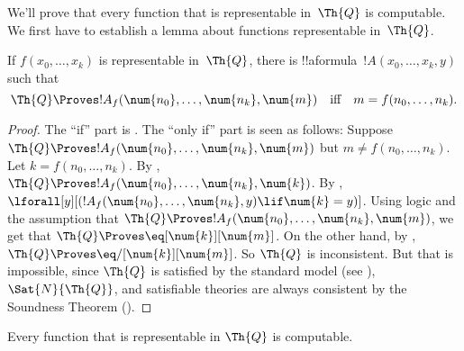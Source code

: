 \documentclass[../../../include/open-logic-section]{subfiles}
\begin{document}

We'll prove that every function that is representable in~$\Th{Q}$ is
computable. We first have to establish a lemma about functions
representable in~$\Th{Q}$.

\begin{lem}
  If $f(x_0,
  \dots, x_k)$ is representable in~$\Th{Q}$, there is
  !!a{formula}~$!A(x_0, \dots, x_k, y)$ such that
  \[
  \Th{Q} \Proves !A_f(\num{n_0}, \dots, \num{n_k}, \num{m})
  \quad\text{iff}\quad m = f(n_0, \dots, n_k).
  \]
\end{lem}

\begin{proof}
  The ``if'' part is
. The ``only
if'' part is seen as follows: Suppose $\Th{Q} \Proves !A_f(\num{n_0},
\dots, \num{n_k}, \num{m})$ but $m \neq f(n_0, \dots, n_k)$. Let $k =
f(n_0, \dots, n_k)$. By
, $\Th{Q}
\Proves !A_f(\num{n_0}, \dots, \num{n_k}, \num{k})$. By
,
$\lforall[y][(!A_f(\num{n_0}, \dots, \num{n_k}, y) \lif \num{k} =
y)]$. Using logic and the assumption that $\Th{Q} \Proves
!A_f(\num{n_0}, \dots, \num{n_k}, \num{m})$, we get that $\Th{Q}
\Proves \eq[\num{k}][\num{m}]$. On the other hand, by
, $\Th{Q} \Proves
\eq/[\num{k}][\num{m}]$. So $\Th{Q}$ is inconsistent. But that is
impossible, since $\Th{Q}$ is satisfied by the standard model (see
), $\Sat{N}{\Th{Q}}$, and
satisfiable theories are always consistent by the Soundness Theorem
().
\end{proof}

\begin{lem}
Every function that is representable in $\Th{Q}$ is computable.
\end{lem}
\end{document}
